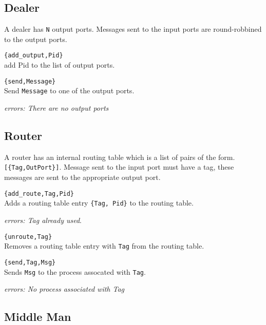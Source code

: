 \documentclass[10pt]{article}
\begin{document}
\subsection{Dealer}

A dealer has \verb+N+ output ports. 
Messages sent to the input ports are round-robbined to
the output ports.

\begin{description}

\item \verb+{add_output,Pid}+\\
add Pid to the list of output ports.

\item \verb+{send,Message}+\\
  Send \verb+Message+ to one of the output ports.
  
  {\sl errors: There are no output ports}
\end{description}

\subsection{Router}

A router has an internal routing table which is a list of pairs of the form.
\verb+[{Tag,OutPort}]+. Message sent to the input port must have
a tag, these messages are sent to the appropriate output port.

\begin{description}
\item \verb+{add_route,Tag,Pid}+\\
  Adds a routing table entry \verb+{Tag, Pid}+ to the
  routing table. 

  {\sl errors: Tag already used}. 
  
\item \verb+{unroute,Tag}+\\
  Removes a routing table entry with \verb+Tag+ from the routing table.
  
\item \verb+{send,Tag,Msg}+\\
  Sends \verb+Msg+ to the process assocated with \verb+Tag+.
  
  {\sl errors: No process associated with Tag}
  
\end{description}

\subsection{Middle Man}
\end{document}

